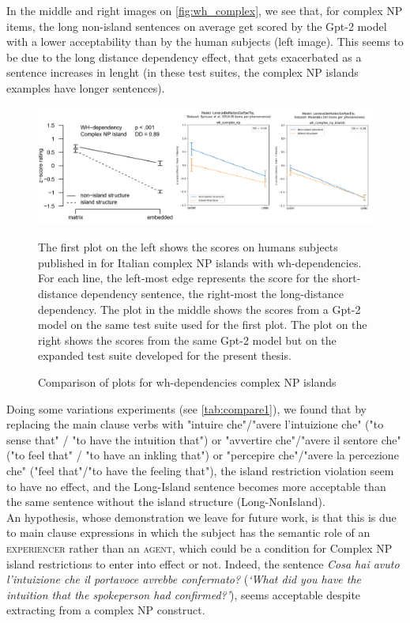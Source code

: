 In the middle and right images on \autoref{fig:wh_complex}, we see that, for complex NP items, the long non-island sentences on average get scored by the Gpt-2 model with a lower acceptability than by the human subjects (left image). This seems to be due to the long distance dependency effect, that gets exacerbated as a sentence increases in lenght (in these test suites, the complex NP islands examples have longer sentences).

\begin{figure}
	\centering
	\includegraphics[width=1\textwidth]{images/Chapter1/combined_wh-complex.png} 
	\caption{Comparison of plots for wh-dependencies complex NP islands} 
	\label{fig:wh_complex} %
	\medskip
	\small
	The first plot on the left shows the scores on humans subjects published in \citet{sprouse2016experimental} for Italian complex NP islands with wh-dependencies. For each line, the left-most edge represents the score for the short-distance dependency sentence, the right-most the long-distance dependency. The plot in the middle shows the scores from a Gpt-2 model \citep{de2020geppetto} on the same test suite used for the first plot. The plot on the right shows the scores from the same Gpt-2 model but on the expanded test suite developed for the present thesis.
\end{figure}

Doing some variations experiments (see  \autoref{tab:compare1}), we found that by replacing the main clause verbs with "intuire che"/"avere l'intuizione che" ("to sense that" / "to have the intuition that") or "avvertire che"/"avere il sentore che" ("to feel that" / "to have an inkling that") or "percepire che"/"avere la percezione che" ("feel that"/"to have the feeling that"), the island restriction violation seem to have no effect, and the Long-Island sentence becomes more acceptable than the same sentence without the island structure (Long-NonIsland). \\ 
An hypothesis, whose demonstration we leave for future work, is that this is due to main clause expressions in which the subject has the semantic role of an \textsc{experiencer} rather than an \textsc{agent}, which could be a condition for Complex NP island restrictions to enter into effect or not. Indeed, the sentence \textit{Cosa hai avuto l'intuizione che il portavoce avrebbe confermato?} (\textit{`What did you have the intuition that the spokeperson had confirmed?'}), seems acceptable despite extracting from a complex NP construct.

